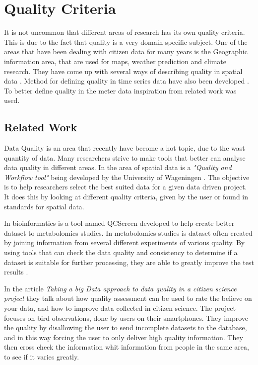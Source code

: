\section{Quality Criteria}
It is not uncommon that different areas of research has its own quality criteria. This is due to the fact that quality is a very domain specific subject. One of the areas that have been dealing with citizen data for many years is the Geographic information area, that are used for maps, weather prediction and climate research. They have come up with several ways of describing quality in spatial data \cite{RefWorks:7}. Method for defining quality in time series data have also been developed  \cite{RefWorks:6}. To better define quality in the meter data inspiration from related work was used.

\subsection{Related Work}
Data Quality is an area that recently have become a hot topic, due to the wast quantity of data. Many researchers strive to make tools that better can analyse data quality in different areas. In the area of spatial data is a \emph{"Quality and Workflow tool"} being developed by the University of Wageningen \citep{RefWorks:8}. The objective is to help researchers select the best suited data for a given data driven project. It does this by looking at different quality criteria, given by the user or found in standards for spatial data. 

In bioinformatics is a tool named QCScreen developed to help create better dataset to metabolomics studies. In metabolomics studies is dataset often created by joining information from several different experiments of various quality. By using tools that can check the data quality and consistency to determine if a dataset is suitable for further processing, they are able to greatly improve the test results \citep{RefWorks:9}.
 
In the article \emph{Taking a big Data approach to data quality in a citizen science project}\citep{RefWorks:2} they talk about how quality assessment can be used to rate the 
believe on your data, and how to improve data collected in citizen science. The project focuses on bird observations, done by users on their smartphones. They improve the quality by disallowing the user to send incomplete datasets to the database, and in this way forcing the user to only deliver high quality information. They then cross check the information whit information from people in the same area, to see if it varies greatly. 

